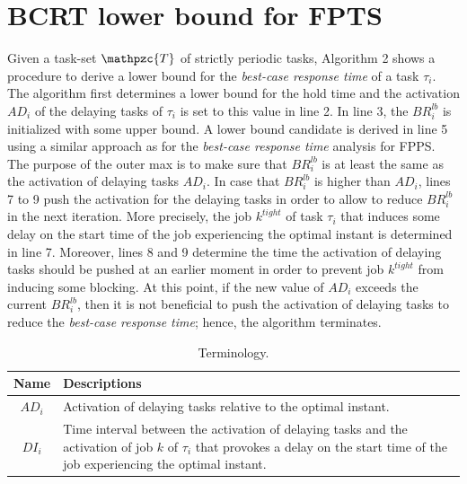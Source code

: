 \documentclass[fleqn]{article}
\begin{document}
\section{BCRT lower bound for FPTS}
Given a task-set $\mathpzc{T}$ of strictly periodic tasks, Algorithm 2 shows a procedure to derive a lower bound for the \textit{best-case response time} of a task $\tau_i$. The algorithm first determines a lower bound for the hold time and the activation $AD_i$ of the delaying tasks of $\tau_i$ is set to this value in line 2. In line 3, the $BR^{lb}_i$ is initialized with some upper bound. A lower bound candidate is derived in line 5 using a similar approach as for the \textit{best-case response time} analysis for FPPS. The purpose of the outer max is to make sure that $BR^{lb}_i$ is at least the same as the activation of delaying tasks $AD_i$. In case that $BR^{lb}_i$ is higher than $AD_i$, lines 7 to 9 push the activation for the delaying tasks in order to allow to reduce $BR^{lb}_i$ in the next iteration. More precisely, the job $k^{tight}$ of task $\tau_i$ that induces some delay on the start time of the job experiencing the optimal instant is determined in line 7. Moreover, lines 8 and 9 determine the time the activation of delaying tasks should be pushed at an earlier moment in order to prevent job $k^{tight}$ from inducing some blocking. At this point, if the new value of $AD_i$ exceeds the current $BR^{lb}_i$, then it is not beneficial to push the activation of delaying tasks to reduce the \textit{best-case response time}; hence, the algorithm terminates.

\begin{table}[H]
	\center
	\caption{Terminology.}
	\label{tab:terminology}
	\begin{tabular}{|c | p{9cm}|}
		\hline
		Name & Descriptions \\ 
		\hline 
		\hline
		$AD_i$& Activation of delaying tasks relative to the optimal instant.\\
		\hline
		$DI_i$& Time interval between the activation of delaying tasks and the activation of job $k$ of $\tau_i$ that provokes a delay on the start time of the job experiencing the optimal instant.\\
		\hline 
	\end{tabular}
\end{table} 
\end{document}
